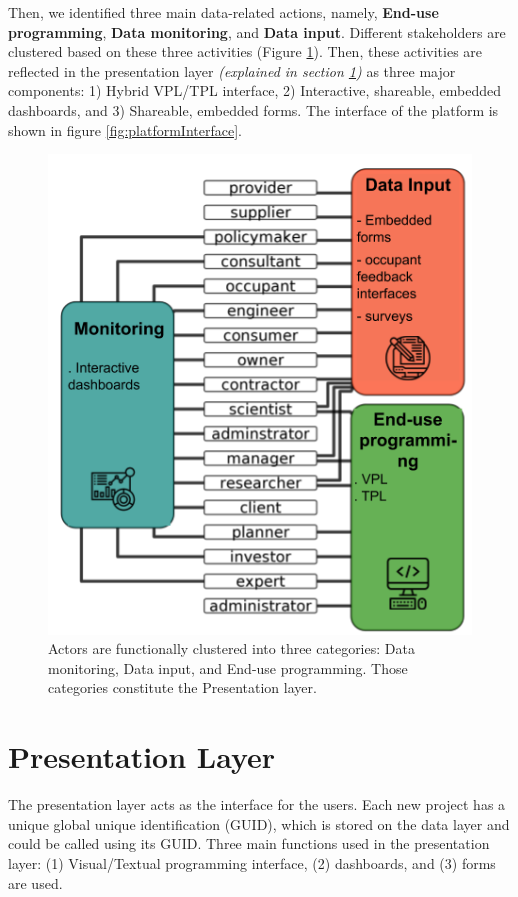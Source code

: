 \documentclass{scsSimAUDPaperFormat}
\begin{document}
Then, we identified three main data-related actions, namely, \textbf{End-use programming}, \textbf{Data monitoring}, and \textbf{Data input}. Different stakeholders are clustered based on these three activities (Figure \ref{fig:figure6}). Then, these activities are reflected in the presentation layer \textit{(explained in section \ref{sec:presentationLayer})}  as three major components: 1) Hybrid VPL/TPL interface, 2) Interactive, shareable, embedded dashboards, and 3) Shareable, embedded forms. The interface of the platform is shown in figure \ref{fig:platformInterface}.

\begin{figure}[h]
\centering
\includegraphics[width=0.8\columnwidth]{imgs/presentation_layer.png}
\caption{Actors are functionally clustered into three categories: Data monitoring, Data input, and End-use programming. Those categories constitute the Presentation layer.}
\label{fig:figure6}
\end{figure}

\section{Presentation Layer}
\label{sec:presentationLayer}
The presentation layer acts as the interface for the users. Each new project has a unique global unique identification (GUID), which is stored on the data layer and could be called using its GUID. Three main functions used in the presentation layer: (1) Visual/Textual programming interface, (2) dashboards, and (3) forms are used.
\end{document}
